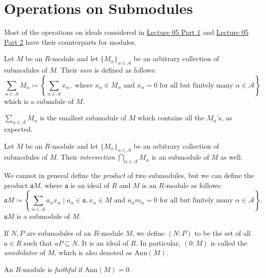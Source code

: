 \section{Operations on Submodules}
Most of the operations on ideals considered in \hyperref[section:lec05pt1]{Lecture 05 Part 1} and \hyperref[section:lec05pt1]{Lecture 05 Part 2} have their counterparts for modules.
\begin{definition}
    Let \(M\) be an  \(R\)-module and let  \(\{M_\alpha\}_{\alpha \in \mathcal{A}}\) be an arbitrary collection of submodules of \(M\). Their \emph{sum} is defined as follows:
    \[
        \sum_{\alpha \in \mathcal{A}} M_\alpha \coloneq \left\{\sum_{\alpha \in \mathcal{A}} x_\alpha, \text{ where } x_\alpha \in M_\alpha \text{ and } x_\alpha = 0 \text{ for all but finitely many } \alpha \in \mathcal{A}\right\}
    \] 
    which is a submdule of \(M\).
\end{definition}
 \(\sum_{\alpha \in \mathcal{A}} M_\alpha\) is the smallest submodule of \(M\) which contains all the  \(M_\alpha\)'s, as expected.
\begin{definition}
     Let \(M\) be an  \(R\)-module and let  \(\{M_\alpha\}_{\alpha \in \mathcal{A}}\) be an arbitrary collection of submodules of \(M\). Their \emph{intersection} \(\bigcap_{\alpha \in \mathcal{A}} M_\alpha\) is an submodule of \(M\) as well.
\end{definition}

We cannot in general define the \emph{product} of two submodules, but we can define the product \(\mathfrak{a}M\), where \(\mathfrak{a}\) is an ideal of \(R\) and \(M\) is an  \(R\)-module as follows:
\[
    \mathfrak{a} M \coloneq \left\{\sum_{\alpha \in \mathcal{A}} a_\alpha x_\alpha  \mid a_\alpha \in \mathfrak{a}, x_\alpha \in M \text{ and } a_\alpha m_\alpha = 0 \text{ for all but finitely many } \alpha \in \mathcal{A}\right\}. 
\] 
\(\mathfrak{a}M\) is a submodule of \(M\).

If \(N, P\) are submodules of an \(R\)-module \(M\), we define  \((N: P)\) to be the set of all  \(a \in R\) such that  \(aP \subseteq N\). It is an ideal of \(R\). In particular, \((0: M)\) is called the \emph{annihilator} of  \(M\), which is also denoted as  \(\text{Ann}(M)\).
\begin{definition}
    An \(R\)-module is \emph{faithful} if  \(\text{Ann}(M) = 0\).
\end{definition}
